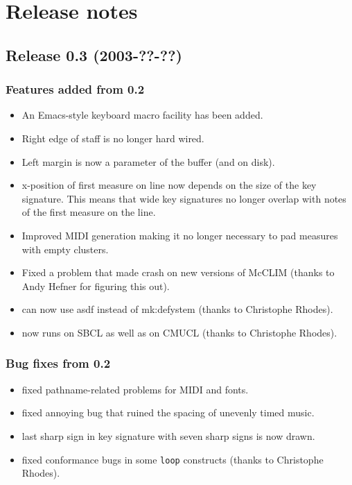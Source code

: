 \chapter{Release notes}

\section{Release 0.3 (2003-??-??)}

\subsection{Features added from 0.2}

\begin{itemize}
\item An Emacs-style keyboard macro facility has been added. 
\item Right edge of staff is no longer hard wired.
\item Left margin is now a parameter of the buffer (and on disk).
\item x-position of first measure on line now depends on the size of
  the key signature.  This means that wide key signatures no longer
  overlap with notes of the first measure on the line.
\item Improved MIDI generation making it no longer necessary to pad 
measures with empty clusters.
\item Fixed a problem that made {\gs} crash on new versions of
  McCLIM (thanks to Andy Hefner for figuring this out). 
\item {\gs} can now use asdf instead of mk:defystem (thanks to
  Christophe Rhodes).
\item {\gs} now runs on SBCL as well as on CMUCL (thanks to Christophe
  Rhodes).
\end{itemize}

\subsection{Bug fixes from 0.2}

\begin{itemize}
\item fixed pathname-related problems for MIDI and fonts. 
\item fixed annoying bug that ruined the spacing of unevenly timed
  music. 
\item last sharp sign in key signature with seven sharp signs is now
  drawn. 
\item fixed conformance bugs in some \texttt{loop} constructs (thanks to
  Christophe Rhodes).
\end{itemize}

